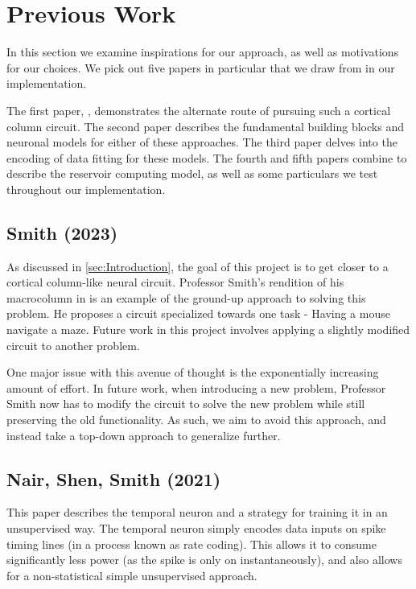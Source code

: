 \section{Previous Work} \label{sec:PreviousWork}

In this section we examine inspirations for our approach, as well as motivations
for our choices. We pick out five papers in particular that we draw from in our
implementation.

The first paper, \cite{Macrocolumn}, demonstrates the alternate route of
pursuing such a cortical column circuit. The second paper \cite{TNN} describes
the fundamental building blocks and neuronal models for either of these
approaches. The third paper \cite{Encoding} delves into the encoding of data
fitting for these models. The fourth \cite{LSM} and fifth \cite{LSM Constraints}
papers combine to describe the reservoir computing model, as well as some
particulars we test throughout our implementation.

\subsection{Smith (2023)}

As discussed in \ref{sec:Introduction}, the goal of this project is to get
closer to a cortical column-like neural circuit. Professor Smith's rendition of
his macrocolumn in \cite{Macrocolumn} is an example of the ground-up approach to
solving this problem. He proposes a circuit specialized towards one task -
Having a mouse navigate a maze. Future work in this project involves applying
a slightly modified circuit to another problem.

One major issue with this avenue of thought is the exponentially increasing
amount of effort. In future work, when introducing a new problem, Professor
Smith now has to modify the circuit to solve the new problem while still
preserving the old functionality. As such, we aim to avoid this approach, and
instead take a top-down approach to generalize further.

\subsection{Nair, Shen, Smith (2021)}

This paper \cite{TNN} describes the temporal neuron and a strategy for training
it in an unsupervised way. The temporal neuron simply encodes data inputs on
spike timing lines (in a process known as rate coding). This allows it to
consume significantly less power (as the spike is only on instantaneously), and
also allows for a non-statistical simple unsupervised approach.


